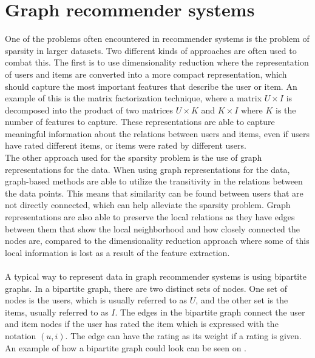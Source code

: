 \section{Graph recommender systems}\label{sec:graph-rec-sys}
One of the problems often encountered in recommender systems is the problem of sparsity in larger datasets.
Two different kinds of approaches are often used to combat this. 
The first is to use dimensionality reduction where the representation of users and items are converted into a more compact representation, which should capture the most important features that describe the user or item.
An example of this is the matrix factorization technique, where a matrix $U \times I$ is decomposed into the product of two matrices $U \times K $ and $ K \times I$ where $K$ is the number of features to capture.
These representations are able to capture meaningful information about the relations between users and items, even if users have rated different items, or items were rated by different users. 
\\
The other approach used for the sparsity problem is the use of graph representations for the data.
When using graph representations for the data, graph-based methods are able to utilize the transitivity in the relations between the data points. 
This means that similarity can be found between users that are not directly connected, which can help alleviate the sparsity problem.
Graph representations are also able to preserve the local relations as they have edges between them that show the local neighborhood and how closely connected the nodes are, compared to the dimensionality reduction approach where some of this local information is lost as a result of the feature extraction\cite{RecommenderHandbook2015}.
\\\\
A typical way to represent data in graph recommender systems is using bipartite graphs.
In a bipartite graph, there are two distinct sets of nodes.
One set of nodes is the users, which is usually referred to as $U$, and the other set is the items, usually referred to as $I$.
The edges in the bipartite graph connect the user and item nodes if the user has rated the item which is expressed with the notation $(u, i)$. 
The edge can have the rating as its weight if a rating is given.
An example of how a bipartite graph could look can be seen on .
\\\\
